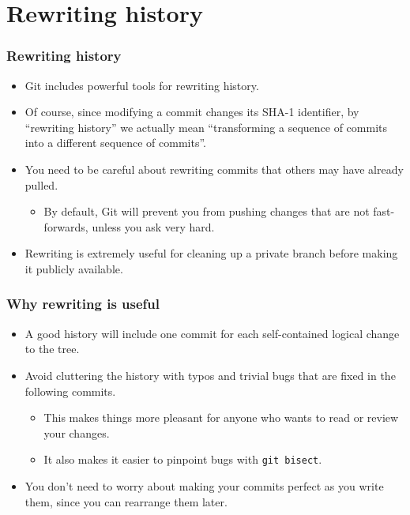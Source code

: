 \documentclass{beamer}
\begin{document}
\section{Rewriting history}

\begin{frame}
  \frametitle{Rewriting history}

  \begin{itemize}
  \item Git includes powerful tools for rewriting history.
  \item Of course, since modifying a commit changes its SHA-1
    identifier, by ``rewriting history'' we actually mean
    ``transforming a sequence of commits into a different sequence of
    commits''.
  \item You need to be careful about rewriting commits that others may
    have already pulled.
    \begin{itemize}
    \item By default, Git will prevent you from pushing changes that
      are not fast-forwards, unless you ask very hard.
    \end{itemize}
  \item Rewriting is extremely useful for cleaning up a private branch
    before making it publicly available.
  \end{itemize}
\end{frame}

\begin{frame}
  \frametitle{Why rewriting is useful}

  \begin{itemize}
  \item A good history will include one commit for each self-contained
    logical change to the tree.
  \item Avoid cluttering the history with typos and trivial bugs that
    are fixed in the following commits.
    \begin{itemize}
    \item This makes things more pleasant for anyone who wants to read
      or review your changes.
    \item It also makes it easier to pinpoint bugs with \texttt{git
        bisect}.
    \end{itemize}
  \item You don't need to worry about making your commits perfect as
    you write them, since you can rearrange them later.
  \end{itemize}
\end{frame}
\end{document}
